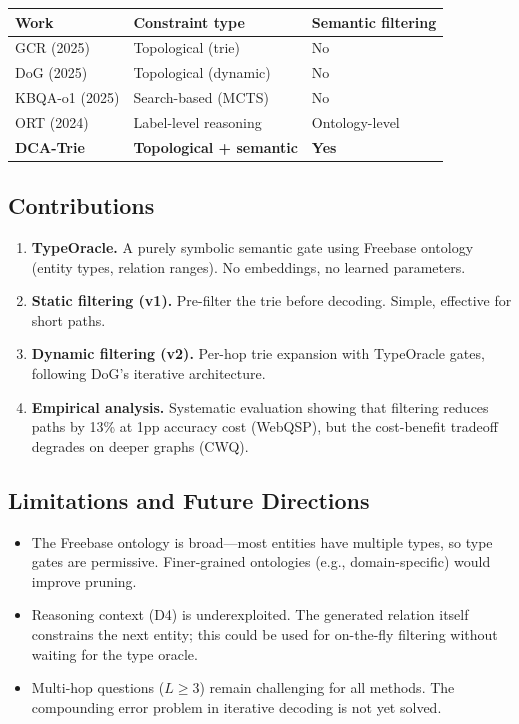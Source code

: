 \documentclass[11pt,a4paper]{article}
\begin{document}
\begin{center}
\small
\begin{tabular}{@{}lll@{}}
\toprule
  Work & Constraint type & Semantic filtering \\
\midrule
  GCR (2025)           & Topological (trie)      & No \\
  DoG (2025)           & Topological (dynamic)   & No \\
  KBQA-o1 (2025)       & Search-based (MCTS)     & No \\
  ORT (2024)           & Label-level reasoning   & Ontology-level \\
  \textbf{DCA-Trie}    & \textbf{Topological + semantic} & \textbf{Yes} \\
\bottomrule
\end{tabular}
\end{center}

\subsection{Contributions}

\begin{enumerate}
  \item \textbf{TypeOracle.}  A purely symbolic semantic gate using
    Freebase ontology (entity types, relation ranges).  No embeddings,
    no learned parameters.

  \item \textbf{Static filtering (v1).}  Pre-filter the trie before
    decoding.  Simple, effective for short paths.

  \item \textbf{Dynamic filtering (v2).}  Per-hop trie expansion with
    TypeOracle gates, following DoG's iterative architecture.

  \item \textbf{Empirical analysis.}  Systematic evaluation showing
    that filtering reduces paths by 13\% at 1pp accuracy cost (WebQSP),
    but the cost-benefit tradeoff degrades on deeper graphs (CWQ).
\end{enumerate}

\subsection{Limitations and Future Directions}

\begin{itemize}
  \item The Freebase ontology is broad---most entities have multiple
    types, so type gates are permissive.  Finer-grained ontologies
    (e.g., domain-specific) would improve pruning.

  \item Reasoning context (D4) is underexploited.  The generated relation
    itself constrains the next entity; this could be used for on-the-fly
    filtering without waiting for the type oracle.

  \item Multi-hop questions ($L \geq 3$) remain challenging for all
    methods.  The compounding error problem in iterative decoding is
    not yet solved.
\end{itemize}
\end{document}
